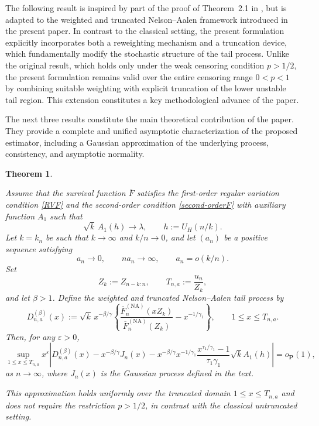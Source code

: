 \documentclass[reqno,openbib,runningheads,a4paper,12pt]{amsart}%
\newtheorem{theorem}{Theorem}[section]
\begin{document}
\noindent The following result is inspired by part of the proof of Theorem~2.1
in \cite{MNS2025}, but is adapted to the weighted and truncated Nelson--Aalen
framework introduced in the present paper. In contrast to the classical
setting, the present formulation explicitly incorporates both a reweighting
mechanism and a truncation device, which fundamentally modify the stochastic
structure of the tail process. Unlike the original result, which holds only
under the weak censoring condition $p>1/2$, the present formulation remains
valid over the entire censoring range $0<p<1$ by combining suitable weighting
with explicit truncation of the lower unstable tail region. This extension
constitutes a key methodological advance of the paper.\smallskip

\noindent The next three results constitute the main theoretical contribution
of the paper. They provide a complete and unified asymptotic characterization
of the proposed estimator, including a Gaussian approximation of the
underlying process, consistency, and asymptotic normality.

\begin{theorem}
\label{theorem1}

Assume that the survival function $\overline{F}$ satisfies the first-order
regular variation condition \eqref{RVF} and the second-order condition
\eqref{second-orderF} with auxiliary function $A_{1}$ such that
\[
\sqrt{k}\,A_{1}(h)\longrightarrow\lambda,\qquad h:=U_{H}(n/k).
\]
Let $k=k_{n}$ be such that $k\rightarrow\infty$ and $k/n\rightarrow0$, and let
$(a_{n})$ be a positive sequence satisfying
\[
a_{n}\rightarrow0,\qquad na_{n}\rightarrow\infty,\qquad a_{n}=o(k/n).
\]
Set
\[
Z_{k}:=Z_{n-k:n},\qquad T_{n,a}:=\frac{u_{n}}{Z_{k}},
\]
and let $\beta>1$. Define the weighted and truncated Nelson--Aalen tail
process by
\[
D_{n,a}^{(\beta)}(x):=\sqrt{k}\,x^{-\beta/\gamma}\left\{  \frac{\overline
{F}_{n}^{(\mathrm{NA})}(xZ_{k})}{\overline{F}_{n}^{(\mathrm{NA})}(Z_{k}%
)}-x^{-1/\gamma_{1}}\right\}  ,\qquad1\leq x\leq T_{n,a}.
\]
Then, for any $\varepsilon>0$,
\[
\sup_{1\leq x\leq T_{n,a}}x^{\varepsilon}\left\vert D_{n,a}^{(\beta
)}(x)-x^{-\beta/\gamma}J_{n}(x)-x^{-\beta/\gamma}x^{-1/\gamma_{1}}%
\frac{x^{\tau_{1}/\gamma_{1}}-1}{\tau_{1}\gamma_{1}}\sqrt{k}A_{1}%
(h)\right\vert =o_{\mathbf{P}}(1),
\]
as $n\rightarrow\infty$, where $J_{n}(x)$ is the Gaussian process defined in
the text.\smallskip

\noindent This approximation holds uniformly over the truncated domain $1 \le
x \le T_{n,a}$ and does not require the restriction $p>1/2$, in contrast with
the classical untruncated setting.
\end{theorem}
\end{document}

